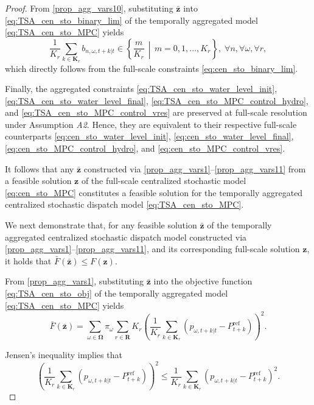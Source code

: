 \documentclass[10pt,a4paper]{amsart}
\begin{document}
\begin{proof}
From \eqref{prop_agg_vars10}, substituting $\boldsymbol{\bar{z}}$ into
\eqref{eq:TSA_cen_sto_binary_lim} of the temporally aggregated model
\eqref{eq:TSA_cen_sto_MPC} yields
\begin{equation}
\frac{1}{K_r} \sum_{k \in \boldsymbol{K}_r}
b_{n,\omega,t+k|t} \in \left\{ \frac{m}{K_r} \,\middle|\, m = 0,1,\dots,K_r \right\}, \; \forall n, \forall \omega, \forall r,
\end{equation}
which directly follows from the full-scale constraints \eqref{eq:cen_sto_binary_lim}.

Finally, the aggregated constraints
\eqref{eq:TSA_cen_sto_water_level_init},
\eqref{eq:TSA_cen_sto_water_level_final},
\eqref{eq:TSA_cen_sto_MPC_control_hydro}, and
\eqref{eq:TSA_cen_sto_MPC_control_vres}
are preserved at full-scale resolution under Assumption \textit{A2}.
Hence, they are equivalent to their respective full-scale counterparts
\eqref{eq:cen_sto_water_level_init},
\eqref{eq:cen_sto_water_level_final},
\eqref{eq:cen_sto_MPC_control_hydro}, and
\eqref{eq:cen_sto_MPC_control_vres}.

It follows that any $\boldsymbol{\bar{z}}$ constructed via \eqref{prop_agg_vars1}--\eqref{prop_agg_vars11} from a feasible solution $\boldsymbol{z}$ of the full-scale centralized stochastic model \eqref{eq:cen_sto_MPC}
constitutes a feasible solution for the temporally aggregated centralized stochastic dispatch model \eqref{eq:TSA_cen_sto_MPC}.

We next demonstrate that, for any feasible solution $\boldsymbol{\bar{z}}$ of the temporally aggregated centralized stochastic dispatch model constructed via
\eqref{prop_agg_vars1}--\eqref{prop_agg_vars11}, and its corresponding full-scale solution $\boldsymbol{z}$,
it holds that $\bar{F}(\boldsymbol{\bar{z}}) \leq F(\boldsymbol{z})$.

From \eqref{prop_agg_vars1}, substituting $\boldsymbol{\bar{z}}$ into the objective function \eqref{eq:TSA_cen_sto_obj} of the temporally aggregated model \eqref{eq:TSA_cen_sto_MPC} yields
\begin{equation}
\bar{F}(\boldsymbol{\bar{z}}) =
\sum_{\omega \in \boldsymbol{\Omega}}
\pi_{\omega}
\sum_{r \in \boldsymbol{R}} K_r
\left(
\frac{1}{K_r} \sum_{k \in \boldsymbol{K}_r}
\left(p_{\omega,t+k|t} - P^{\mathrm{ref}}_{t+k}\right)
\right)^2.
\label{prop:proof_obj1}
\end{equation}

Jensen’s inequality implies that
\begin{equation}
\left(\frac{1}{K_r} \sum_{k \in \boldsymbol{K}_r}
\left(p_{\omega,t+k|t} - P^{\mathrm{ref}}_{t+k}\right)
\right)^2
\leq
\frac{1}{K_r} \sum_{k \in \boldsymbol{K}_r}
\left(p_{\omega,t+k|t} - P^{\mathrm{ref}}_{t+k}\right)^2.
\label{prop:proof_obj2}
\end{equation}


\end{proof}
\end{document}
